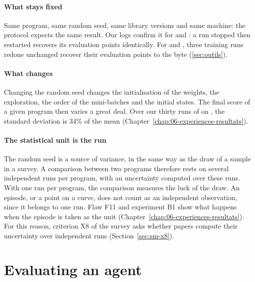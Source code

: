 \paragraph{What stays fixed}
Same program, same random seed, same library versions and same machine: the protocol expects the same
result. Our logs confirm it for  and : a run stopped then restarted recovers its evaluation
points identically. For  and , three training runs redone unchanged recover their
evaluation points to the byte (\cref{sec:outils}).

\paragraph{What changes}
Changing the random seed changes the initialisation of the weights, the exploration, the order of the
mini-batches and the initial states. The final score of a given program then varies a great deal. Over our thirty runs of
 on , the standard deviation is 34\% of the mean
(Chapter~\ref{chap:06-experiences-resultats}).

\paragraph{The statistical unit is the run}
The random seed is a source of variance, in the same way as the draw of a sample in a survey. A
comparison between two programs therefore rests on several independent runs per program, with an
uncertainty computed over these runs. With one run per program, the comparison measures the luck of
the draw. An episode, or a point on a curve, does not count as an independent observation, since it
belongs to one run. Flaw F11 and experiment B1 show what happens when the episode is taken as the unit
(Chapter~\ref{chap:06-experiences-resultats}). For this reason, criterion X8 of the survey asks whether
papers compute their uncertainty over independent runs (Section~\ref{sec:sm-x8}).

\section{Evaluating an agent}\label{sec:ctx-evaluation}

